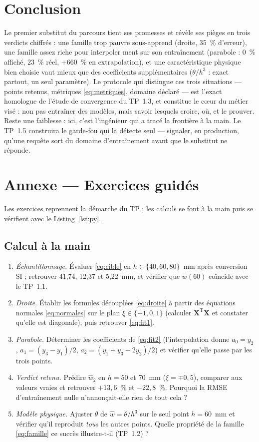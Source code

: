 \documentclass[10pt,journal]{IEEEtran}
\begin{document}
\section{Conclusion}
Le premier substitut du parcours tient ses promesses et révèle ses pièges en trois verdicts chiffrés : une famille trop pauvre sous-apprend (droite, 35~\% d'erreur), une famille assez riche pour interpoler ment sur son entraînement (parabole : 0~\% affiché, 23~\% réel, $+660$~\% en extrapolation), et une caractéristique physique bien choisie vaut mieux que des coefficients supplémentaires ($\theta/h^3$ : exact partout, un seul paramètre). Le protocole qui distingue ces trois situations --- points retenus, métriques \eqref{eq:metriques}, domaine déclaré --- est l'exact homologue de l'étude de convergence du TP~1.3, et constitue le c\oe{}ur du métier visé : non pas entraîner des modèles, mais savoir lesquels croire, où, et le prouver. Reste une faiblesse : ici, c'est l'ingénieur qui a tracé la frontière à la main. Le TP~1.5 construira le garde-fou qui la détecte seul --- signaler, en production, qu'une requête sort du domaine d'entraînement avant que le substitut ne réponde.

\appendices
\section*{Annexe --- Exercices guidés}
Les exercices reprennent la démarche du TP ; les calculs se font à la main puis se vérifient avec le Listing~\ref{lst:py}.

\subsection{Calcul à la main}
\begin{enumerate}[leftmargin=1.4em]
\item \emph{Échantillonnage.} Évaluer \eqref{eq:cible} en $h\in\{40,60,80\}$~mm après conversion SI ; retrouver 41,74, 12,37 et 5,22~mm, et vérifier que $w(60)$ coïncide avec le TP~1.1.
\item \emph{Droite.} Établir les formules découplées \eqref{eq:droite} à partir des équations normales \eqref{eq:normales} sur le plan $\xi\in\{-1,0,1\}$ (calculer $\mathbf{X}^{\mathrm T}\mathbf{X}$ et constater qu'elle est diagonale), puis retrouver \eqref{eq:fit1}.
\item \emph{Parabole.} Déterminer les coefficients de \eqref{eq:fit2} (l'interpolation donne $a_0 = y_2$, $a_1 = (y_3-y_1)/2$, $a_2 = (y_1+y_3-2y_2)/2$) et vérifier qu'elle passe par les trois points.
\item \emph{Verdict retenu.} Prédire $\hat w_2$ en $h=50$ et 70~mm ($\xi=\mp 0{,}5$), comparer aux valeurs vraies et retrouver $+13{,}6$~\% et $-22{,}8$~\%. Pourquoi la RMSE d'entraînement nulle n'annonçait-elle rien de tout cela ?
\item \emph{Modèle physique.} Ajuster $\theta$ de $\hat w = \theta/h^3$ sur le seul point $h=60$~mm et vérifier qu'il reproduit \emph{tous} les autres points. Quelle propriété de la famille \eqref{eq:famille} ce succès illustre-t-il (TP~1.2) ?
\end{enumerate}
\end{document}
